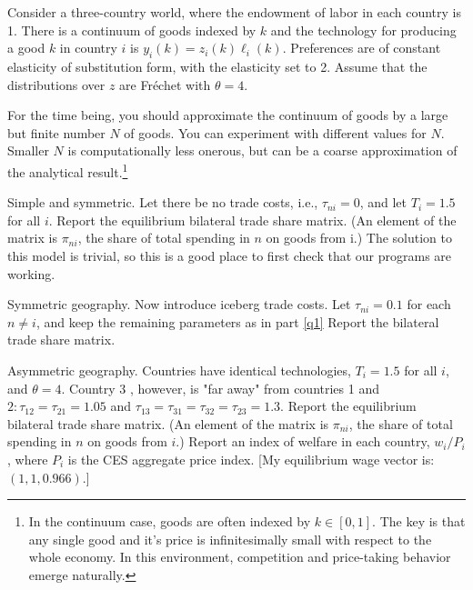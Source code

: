 \documentclass[11pt, assign]{assign}
\begin{document}
\begin{problem}[title=Simple Version of Ricardian Trade Model,source={Eaton and Kortum, 2002}]%

Consider a three-country world, where the endowment of labor in each country is 1. There is a continuum of goods indexed by $k$ and the technology for producing a good $k$ in country $i$ is $y_{i}(k)=z_{i}(k) \ell_{i}(k)$. Preferences are of constant elasticity of substitution form, with the elasticity set to 2. Assume that the distributions over $z$ are Fr\'echet with $\theta=4$.

For the time being, you should approximate the continuum of goods by a large but finite number $N$ of goods. You can experiment with different values for $N$. Smaller $N$ is computationally less onerous, but can be a coarse approximation of the analytical result.\footnote{In the continuum case, goods are often indexed by $k \in [0,1]$. The key is that any single good and it's price is infinitesimally small with respect to the whole economy. In this environment, competition and price-taking behavior emerge naturally.}

\begin{subproblems}

\question Simple and symmetric. Let there be no trade costs, i.e., $\tau_{n i}=0$, and let $T_{i}=1.5$ for all $i$. Report the equilibrium bilateral trade share matrix. (An element of the matrix is $\pi_{n i}$, the share of total spending in $n$ on goods from i.) The solution to this model is trivial, so this is a good place to first check that our programs are working. \label{q1}

\question Symmetric geography. Now introduce iceberg trade costs. Let $\tau_{n i}=0.1$ for each $n \neq i$, and keep the remaining parameters as in part \ref{q1} Report the bilateral trade share matrix.

\question Asymmetric geography. Countries have identical technologies, $T_{i}=1.5$ for all $i$, and $\theta=4$. Country 3 , however, is "far away" from countries 1 and $2: \tau_{12}=\tau_{21}=1.05$ and $\tau_{13}=\tau_{31}=\tau_{32}=\tau_{23}=1.3$. Report the equilibrium bilateral trade share matrix. (An element of the matrix is $\pi_{n i}$, the share of total spending in $n$ on goods from $i$.) Report an index of welfare in each country, $w_{i} / P_{i}$, where $P_{i}$ is the CES aggregate price index. [My equilibrium wage vector is: $(1,1,0.966)$.]


\end{subproblems}
\end{problem}
\end{document}
